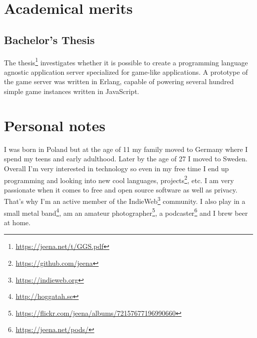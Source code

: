 \documentclass{twocolcv}
\begin{document}
\section*{Academical merits}

\subsection*{Bachelor's Thesis}
The thesis\footnote{\url{https://jeena.net/t/GGS.pdf}} investigates whether it is possible to create a programming language agnostic application server specialized for game-like applications. A prototype of the game server was written in Erlang, capable of powering several hundred simple game instances written in JavaScript.

\section*{Personal notes}
  {I was born in Poland but at the age of 11 my family moved to Germany where I spend my teens and early adulthood. Later by the age of 27 I moved to Sweden.}
  {Overall I'm very interested in technology so even in my free time I end up programming and looking into new cool languages, projects\footnote{\url{https://github.com/jeena}}, etc. I am very passionate when it comes to free and open source software as well as privacy. That's why I'm an active member of the IndieWeb\footnote{\url{https://indieweb.org}} community.}
  {I also play in a small metal band\footnote{\url{http://hoggatah.se}}, am an amateur photographer\footnote{\url{https://flickr.com/jeena/albums/72157677196990660}}, a podcaster\footnote{\url{https://jeena.net/pods/}} and I brew beer at home.}
\end{document}
